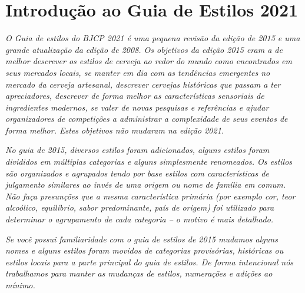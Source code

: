 \clearpage
{}
\divisorLine
\section*{Introdução ao Guia de Estilos 2021}
\textit{O Guia de estilos do BJCP 2021 é uma pequena revisão da edição de 2015 e uma grande atualização da edição de 2008. Os objetivos da edição 2015 eram a de melhor descrever os estilos de cerveja ao redor do mundo como encontrados em seus mercados locais, se manter em dia com as tendências emergentes no mercado da cerveja artesanal, descrever cervejas históricas que passam a ter apreciadores, descrever de forma melhor as características sensoriais de ingredientes modernos, se valer de novas pesquisas e referências e ajudar organizadores de competições a administrar a complexidade de seus eventos de forma melhor. Estes objetivos não mudaram na edição 2021.}

\textit{No guia de 2015, diversos estilos foram adicionados, alguns estilos foram divididos em múltiplas categorias e alguns simplesmente renomeados. Os estilos são organizados e agrupados tendo por base estilos com características de julgamento similares ao invés de uma origem ou nome de família em comum. Não faça presunções que a mesma característica primária (por exemplo cor, teor alcoólico, equilíbrio, sabor predominante, país de origem) foi utilizado para determinar o agrupamento de cada categoria – o motivo é mais detalhado.}

\textit{Se você possui familiaridade com o guia de estilos de 2015 mudamos alguns nomes e alguns estilos foram movidos de categorias provisórias, históricas ou estilos locais para a parte principal do guia de estilos. De forma intencional nós trabalhamos para manter as mudanças de estilos, numerações e adições ao mínimo.}

\begin{multicols*}{2}





\end{multicols*}